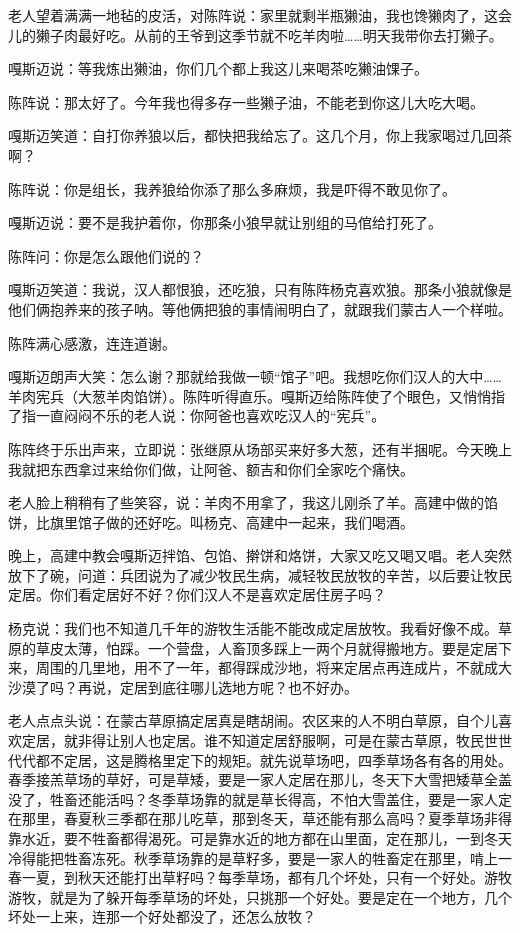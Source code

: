 \par 老人望着满满一地毡的皮活，对陈阵说：家里就剩半瓶獭油，我也馋獭肉了，这会儿的獭子肉最好吃。从前的王爷到这季节就不吃羊肉啦……明天我带你去打獭子。
\par 嘎斯迈说：等我炼出獭油，你们几个都上我这儿来喝茶吃獭油馃子。
\par 陈阵说：那太好了。今年我也得多存一些獭子油，不能老到你这儿大吃大喝。
\par 嘎斯迈笑道：自打你养狼以后，都快把我给忘了。这几个月，你上我家喝过几回茶啊？
\par 陈阵说：你是组长，我养狼给你添了那么多麻烦，我是吓得不敢见你了。
\par 嘎斯迈说：要不是我护着你，你那条小狼早就让别组的马倌给打死了。
\par 陈阵问：你是怎么跟他们说的？
\par 嘎斯迈笑道：我说，汉人都恨狼，还吃狼，只有陈阵杨克喜欢狼。那条小狼就像是他们俩抱养来的孩子呐。等他俩把狼的事情闹明白了，就跟我们蒙古人一个样啦。
\par 陈阵满心感激，连连道谢。
\par 嘎斯迈朗声大笑：怎么谢？那就给我做一顿“馆子”吧。我想吃你们汉人的大中……羊肉宪兵（大葱羊肉馅饼）。陈阵听得直乐。嘎斯迈给陈阵使了个眼色，又悄悄指了指一直闷闷不乐的老人说：你阿爸也喜欢吃汉人的“宪兵”。
\par 陈阵终于乐出声来，立即说：张继原从场部买来好多大葱，还有半捆呢。今天晚上我就把东西拿过来给你们做，让阿爸、额吉和你们全家吃个痛快。
\par 老人脸上稍稍有了些笑容，说：羊肉不用拿了，我这儿刚杀了羊。高建中做的馅饼，比旗里馆子做的还好吃。叫杨克、高建中一起来，我们喝酒。
\par 晚上，高建中教会嘎斯迈拌馅、包馅、擀饼和烙饼，大家又吃又喝又唱。老人突然放下了碗，问道：兵团说为了减少牧民生病，减轻牧民放牧的辛苦，以后要让牧民定居。你们看定居好不好？你们汉人不是喜欢定居住房子吗？
\par 杨克说：我们也不知道几千年的游牧生活能不能改成定居放牧。我看好像不成。草原的草皮太薄，怕踩。一个营盘，人畜顶多踩上一两个月就得搬地方。要是定居下来，周围的几里地，用不了一年，都得踩成沙地，将来定居点再连成片，不就成大沙漠了吗？再说，定居到底往哪儿选地方呢？也不好办。
\par 老人点点头说：在蒙古草原搞定居真是瞎胡闹。农区来的人不明白草原，自个儿喜欢定居，就非得让别人也定居。谁不知道定居舒服啊，可是在蒙古草原，牧民世世代代都不定居，这是腾格里定下的规矩。就先说草场吧，四季草场各有各的用处。春季接羔草场的草好，可是草矮，要是一家人定居在那儿，冬天下大雪把矮草全盖没了，牲畜还能活吗？冬季草场靠的就是草长得高，不怕大雪盖住，要是一家人定在那里，春夏秋三季都在那儿吃草，那到冬天，草还能有那么高吗？夏季草场非得靠水近，要不牲畜都得渴死。可是靠水近的地方都在山里面，定在那儿，一到冬天冷得能把牲畜冻死。秋季草场靠的是草籽多，要是一家人的牲畜定在那里，啃上一春一夏，到秋天还能打出草籽吗？每季草场，都有几个坏处，只有一个好处。游牧游牧，就是为了躲开每季草场的坏处，只挑那一个好处。要是定在一个地方，几个坏处一上来，连那一个好处都没了，还怎么放牧？

